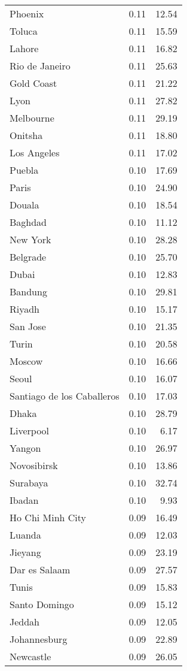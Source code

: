 \begin{longtable}{lrr}
  Phoenix & 0.11 & 12.54 \\ 
  Toluca & 0.11 & 15.59 \\ 
  Lahore & 0.11 & 16.82 \\ 
  Rio de Janeiro & 0.11 & 25.63 \\ 
  Gold Coast & 0.11 & 21.22 \\ 
  Lyon & 0.11 & 27.82 \\ 
  Melbourne & 0.11 & 29.19 \\ 
  Onitsha & 0.11 & 18.80 \\ 
  Los Angeles & 0.11 & 17.02 \\ 
  Puebla & 0.10 & 17.69 \\ 
  Paris & 0.10 & 24.90 \\ 
  Douala & 0.10 & 18.54 \\ 
  Baghdad & 0.10 & 11.12 \\ 
  New York & 0.10 & 28.28 \\ 
  Belgrade & 0.10 & 25.70 \\ 
  Dubai & 0.10 & 12.83 \\ 
  Bandung & 0.10 & 29.81 \\ 
  Riyadh & 0.10 & 15.17 \\ 
  San Jose & 0.10 & 21.35 \\ 
  Turin & 0.10 & 20.58 \\ 
  Moscow & 0.10 & 16.66 \\ 
  Seoul & 0.10 & 16.07 \\ 
  Santiago de los Caballeros & 0.10 & 17.03 \\ 
  Dhaka & 0.10 & 28.79 \\ 
  Liverpool & 0.10 & 6.17 \\ 
  Yangon & 0.10 & 26.97 \\ 
  Novosibirsk & 0.10 & 13.86 \\ 
  Surabaya & 0.10 & 32.74 \\ 
  Ibadan & 0.10 & 9.93 \\ 
  Ho Chi Minh City & 0.09 & 16.49 \\ 
  Luanda & 0.09 & 12.03 \\ 
  Jieyang & 0.09 & 23.19 \\ 
  Dar es Salaam & 0.09 & 27.57 \\ 
  Tunis & 0.09 & 15.83 \\ 
  Santo Domingo & 0.09 & 15.12 \\ 
  Jeddah & 0.09 & 12.05 \\ 
  Johannesburg & 0.09 & 22.89 \\ 
  Newcastle & 0.09 & 26.05 \\ 

\end{longtable}
